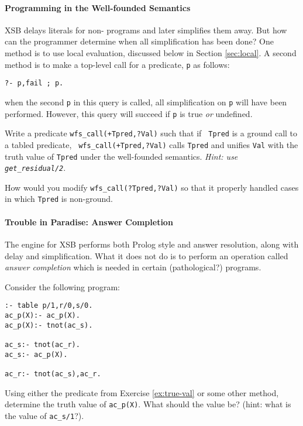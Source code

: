 \paragraph{Programming in the Well-founded Semantics}

XSB delays literals for non-\LRD{} programs and later simplifies them
away.  But how can the programmer determine when all simplification
has been done?  One method is to use local evaluation, discussed below
in Section \ref{sec:local}.  A second method is to make a top-level
call for a predicate, {\tt p} as follows:
\begin{verbatim}
?- p,fail ; p.
\end{verbatim}
when the second {\tt p} in this query is called, all simplification on
{\tt p} will have been performed.  However, this query will succeed if
{\tt p} is true {\em or} undefined.

\begin{exercise} \label{ex:true-val}
Write a predicate {\tt wfs\_call(+Tpred,?Val)} such that if {\tt
Tpred} is a ground call to a tabled predicate, {\tt
wfs\_call(+Tpred,?Val)} calls {\tt Tpred} and unifies {\tt Val} with
the truth value of {\tt Tpred} under the well-founded semantics.
{\em Hint: use {\tt get\_residual/2}}.

How would you modify {\tt wfs\_call(?Tpred,?Val)} so that it properly
handled cases in which {\tt Tpred} is non-ground.
\end{exercise}

\paragraph*{Trouble in Paradise: Answer Completion}

The engine for XSB performs both Prolog style and answer resolution,
along with delay and simplification.  What it does not do is to
perform an operation called {\em answer completion} which is needed in
certain (pathological?) programs.

\begin{exercise}
Consider the following program:
\begin{verbatim}
:- table p/1,r/0,s/0.
ac_p(X):- ac_p(X).
ac_p(X):- tnot(ac_s).

ac_s:- tnot(ac_r).
ac_s:- ac_p(X).

ac_r:- tnot(ac_s),ac_r.
\end{verbatim}
Using either the predicate from Exercise \ref{ex:true-val} or some
other method, determine the truth value of {\tt ac\_p(X)}.  What
should the value be?  (hint: what is the value of {\tt ac\_s/1}?).
\end{exercise}

